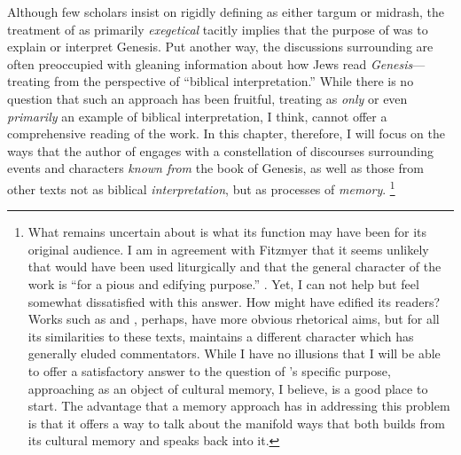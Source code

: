Although few scholars insist on rigidly defining \ga as either targum or midrash, the treatment of \ga as primarily \emph{exegetical} tacitly implies that the purpose of \ga was to explain or interpret Genesis. Put another way, the discussions surrounding \ga are often preoccupied with gleaning information about how \secondtemple Jews read \emph{Genesis}---treating \ga from the perspective of ``biblical interpretation.'' While there is no question that such an approach has been fruitful, treating \ga as \emph{only} or even \emph{primarily} an example of biblical interpretation, I think, cannot offer a comprehensive reading of the work. In this chapter, therefore, I will focus on the ways that the author of \ga engages with a  constellation of discourses surrounding events and characters \emph{known from} the book of Genesis, as well as those from other texts not as biblical \emph{interpretation}, but as processes of \emph{memory}.%
    \footnote{What remains uncertain about \ga is what its function may have been for its original audience. I am in agreement with Fitzmyer that it seems unlikely that \ga would have been used liturgically and that the general character of the work is ``for a pious and edifying purpose.'' \cite[20]{fitzmyer2004}. Yet, I can not help but feel somewhat dissatisfied with this answer. How might \ga have edified its readers? Works such as \jub and \firstenoch, perhaps, have more obvious rhetorical aims, but for all its similarities to these texts, \ga maintains a different character which has generally eluded commentators. While I have no illusions that I will be able to offer a satisfactory answer to the question of \ga's specific purpose, approaching \ga as an object of cultural memory, I believe, is a good place to start. The advantage that a memory approach has in addressing this problem is that it offers a way to talk about the manifold ways that \ga both builds from its cultural memory and speaks back into it.}

